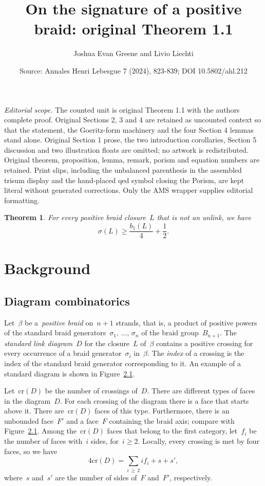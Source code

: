 \documentclass[10pt,a4paper]{amsart}
\title[On the signature of a positive braid]{On the signature of a positive braid: original Theorem 1.1}
\author{Joshua Evan Greene and Livio Liechti}
\date{Source: Annales Henri Lebesgue 7 (2024), 823-839; DOI 10.5802/ahl.212}
\numberwithin{equation}{section}
\newcommand{\rcr}{\mathrm{cr}}
\newtheorem{theo}{Theorem}[section]
\begin{document}
\maketitle
\noindent\textit{Editorial scope.} The counted unit is original Theorem 1.1 with the authors complete proof. Original Sections 2, 3 and 4 are retained as uncounted context so that the statement, the Goeritz-form machinery and the four Section 4 lemmas stand alone. Original Section 1 prose, the two introduction corollaries, Section 5 discussion and two illustration floats are omitted; no artwork is redistributed. Original theorem, proposition, lemma, remark, porism and equation numbers are retained. Print slips, including the unbalanced parenthesis in the assembled trisum display and the hand-placed qed symbol closing the Porism, are kept literal without generated corrections. Only the AMS wrapper supplies editorial formatting.
\setcounter{section}{1}
\begin{theo}\label{quarter_thm}
For every positive braid closure~$L$ that is not an unlink, we have
\[
\sigma(L)\ge \frac{b_1(L)}{4}+\frac{1}{2}.
\]
\end{theo}

\section{Background}\label{s: background}

\subsection{Diagram combinatorics}\label{ss diagrams}
Let~$\beta$ be a~\emph{positive braid} on~$n+1$ strands, that is, a product of positive powers of the standard braid generators~$\sigma_1,\,\dots,\,\sigma_n$ of the braid group~$B_{n+1}$. The \emph{standard link diagram}~$D$ for the closure~$L$ of~$\beta$ contains a positive crossing for every occurrence of a braid generator~$\sigma_i$ in~$\beta$. The \emph{index} of a crossing is the index of the standard braid generator corresponding to it. An example of a standard diagram is shown in Figure~\href{https://ahl.centre-mersenne.org/item/AHL_2024__7__823_0/}{2.1}.



Let~$\rcr (D)$ be the number of crossings of~$D$. There are different types of faces in the diagram~$D$. For each crossing of the diagram there is a face that starts above it. There are~$\rcr (D)$ faces of this type. Furthermore, there is an unbounded face~$F'$ and a face~$F$ containing the braid axis; compare with Figure~\href{https://ahl.centre-mersenne.org/item/AHL_2024__7__823_0/}{2.1}. Among the~$\rcr (D)$ faces that belong to the first category, let~$f_i$ be the number of faces with~$i$ sides, for~$i\ge2$. Locally, every crossing is met by four faces, so we have
\[
4\rcr (D) = \sum_{i\,\ge\,2} if_i + s+s',
\]
where~$s$ and~$s'$ are the number of sides of~$F$ and~$F'$, respectively.
\end{document}

